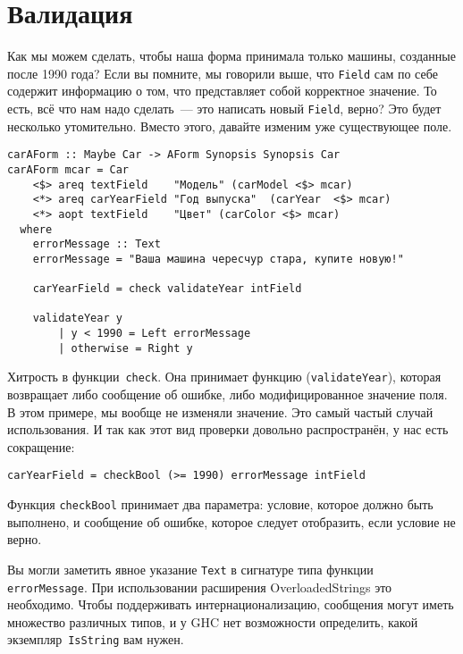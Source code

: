 \section{Валидация}
Как мы можем сделать, чтобы наша форма принимала только машины, созданные
после 1990 года?  Если вы помните, мы говорили выше, что \lstinline'Field' сам
по себе содержит информацию о том, что представляет собой корректное значение. То
есть, всё что нам надо сделать~--- это написать новый \lstinline'Field',
верно? Это будет несколько утомительно. Вместо этого, давайте изменим уже
существующее поле.

\begin{lstlisting}
carAForm :: Maybe Car -> AForm Synopsis Synopsis Car
carAForm mcar = Car
    <$> areq textField    "Модель" (carModel <$> mcar)
    <*> areq carYearField "Год выпуска"  (carYear  <$> mcar)
    <*> aopt textField    "Цвет" (carColor <$> mcar)
  where
    errorMessage :: Text
    errorMessage = "Ваша машина чересчур стара, купите новую!"

    carYearField = check validateYear intField

    validateYear y
        | y < 1990 = Left errorMessage
        | otherwise = Right y
\end{lstlisting}

Хитрость в функции~\lstinline'check'. Она принимает функцию
(\lstinline'validateYear'), которая возвращает либо сообщение об ошибке, либо
модифицированное значение поля. В этом примере, мы вообще не изменяли значение.
Это самый частый случай использования. И так как этот вид проверки
довольно распространён, у нас есть сокращение:

\begin{lstlisting}
carYearField = checkBool (>= 1990) errorMessage intField
\end{lstlisting}

Функция \lstinline'checkBool' принимает два параметра: условие, которое должно
быть выполнено, и сообщение об ошибке, которое следует отобразить, если
условие не верно.

\begin{remark}
Вы могли заметить явное указание \lstinline'Text' в сигнатуре типа функции
\lstinline'errorMessage'. При использовании расширения OverloadedStrings это
необходимо. Чтобы поддерживать интернационализацию, сообщения могут иметь
множество различных типов, и у GHC нет возможности определить, какой
экземпляр~\lstinline'IsString' вам нужен.
\end{remark}

